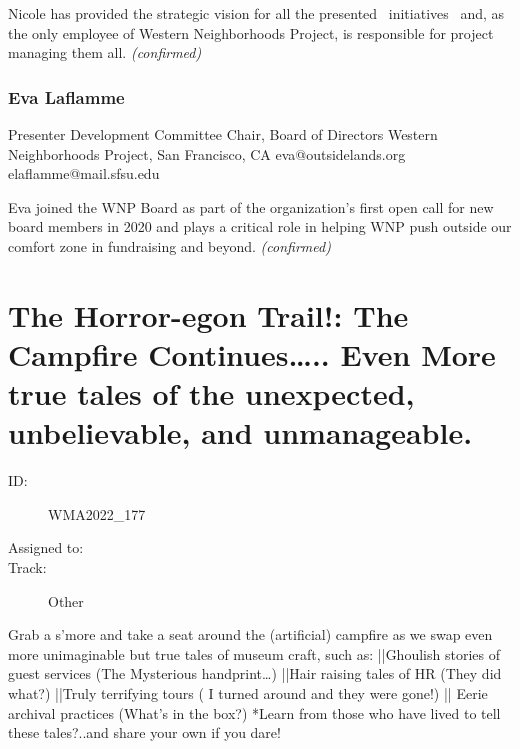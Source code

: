 \documentclass{report}
\begin{document}
                Nicole has provided the strategic vision for all the presented  initiatives  and, as the only employee of Western Neighborhoods Project, is responsible for project managing them all.
                \emph{ (confirmed) }
              

              
                \subsubsection*{ Eva Laflamme }
                Presenter\newline
                Development Committee Chair, Board of Directors\newline
                Western Neighborhoods Project, San Francisco, CA
                \newline
                eva@outsidelands.org\newline
                elaflamme@mail.sfsu.edu\newline
                

                Eva joined the WNP Board as part of the organization’s first open call for new board members in 2020 and plays a critical role in helping WNP push outside our comfort zone in fundraising and beyond.
                \emph{ (confirmed) }
              

              

              
        
          \newpage
          \section{ The Horror-egon Trail!: The Campfire Continues….. Even More true tales of the unexpected, unbelievable, and unmanageable.  }
            \begin{description}
              \item [ID:]
              WMA2022\_177

              \item [Assigned to:]
                \item [Track:]Other~
              \end{description}

              Grab a s’more and take a seat around the (artificial) campfire as we swap even more unimaginable but true tales of museum craft, such as:
||Ghoulish stories of guest services (The Mysterious handprint…)
||Hair raising tales of HR (They did what?)
||Truly terrifying tours ( I turned around and they were gone!)
|| Eerie archival practices (What’s in the box?)
*Learn from those who have lived to tell these tales?..and share your own if you dare!
\end{document}
